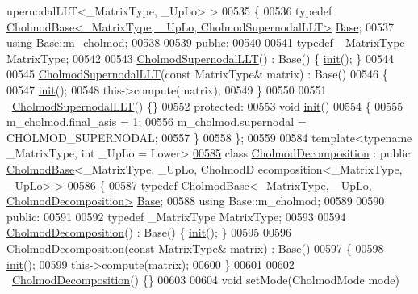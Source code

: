 \begin{DoxyCode}
      upernodalLLT<\_MatrixType, \_UpLo> >
00535 \{
00536     \textcolor{keyword}{typedef} \hyperlink{class_eigen_1_1_cholmod_base}{CholmodBase<\_MatrixType, \_UpLo, CholmodSupernodalLLT>}
       \hyperlink{class_eigen_1_1_cholmod_base}{Base};
00537     \textcolor{keyword}{using} Base::m\_cholmod;
00538     
00539   \textcolor{keyword}{public}:
00540     
00541     \textcolor{keyword}{typedef} \_MatrixType MatrixType;
00542     
00543     \hyperlink{class_eigen_1_1_cholmod_supernodal_l_l_t}{CholmodSupernodalLLT}() : Base() \{ \hyperlink{structinit}{init}(); \}
00544 
00545     \hyperlink{class_eigen_1_1_cholmod_supernodal_l_l_t}{CholmodSupernodalLLT}(\textcolor{keyword}{const} MatrixType& matrix) : Base()
00546     \{
00547       \hyperlink{structinit}{init}();
00548       this->compute(matrix);
00549     \}
00550 
00551     ~\hyperlink{class_eigen_1_1_cholmod_supernodal_l_l_t}{CholmodSupernodalLLT}() \{\}
00552   \textcolor{keyword}{protected}:
00553     \textcolor{keywordtype}{void} \hyperlink{structinit}{init}()
00554     \{
00555       m\_cholmod.final\_asis = 1;
00556       m\_cholmod.supernodal = CHOLMOD\_SUPERNODAL;
00557     \}
00558 \};
00559 
00584 \textcolor{keyword}{template}<\textcolor{keyword}{typename} \_MatrixType, \textcolor{keywordtype}{int} \_UpLo = Lower>
\hyperlink{class_eigen_1_1_cholmod_decomposition}{00585} \textcolor{keyword}{class }\hyperlink{class_eigen_1_1_cholmod_decomposition}{CholmodDecomposition} : \textcolor{keyword}{public} \hyperlink{class_eigen_1_1_cholmod_base}{CholmodBase}<\_MatrixType, \_UpLo, CholmodD
      ecomposition<\_MatrixType, \_UpLo> >
00586 \{
00587     \textcolor{keyword}{typedef} \hyperlink{class_eigen_1_1_cholmod_base}{CholmodBase<\_MatrixType, \_UpLo, CholmodDecomposition>}
       \hyperlink{class_eigen_1_1_cholmod_base}{Base};
00588     \textcolor{keyword}{using} Base::m\_cholmod;
00589     
00590   \textcolor{keyword}{public}:
00591     
00592     \textcolor{keyword}{typedef} \_MatrixType MatrixType;
00593     
00594     \hyperlink{class_eigen_1_1_cholmod_decomposition}{CholmodDecomposition}() : Base() \{ \hyperlink{structinit}{init}(); \}
00595 
00596     \hyperlink{class_eigen_1_1_cholmod_decomposition}{CholmodDecomposition}(\textcolor{keyword}{const} MatrixType& matrix) : Base()
00597     \{
00598       \hyperlink{structinit}{init}();
00599       this->compute(matrix);
00600     \}
00601 
00602     ~\hyperlink{class_eigen_1_1_cholmod_decomposition}{CholmodDecomposition}() \{\}
00603     
00604     \textcolor{keywordtype}{void} setMode(CholmodMode mode)

\end{DoxyCode}
